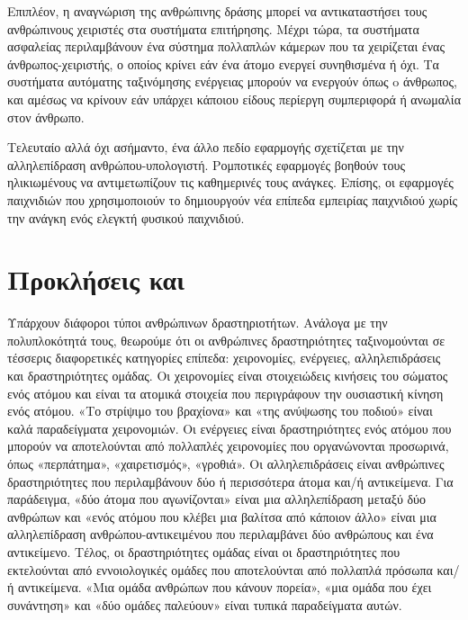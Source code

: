 Επιπλέον, η αναγνώριση της ανθρώπινης δράσης μπορεί να αντικαταστήσει τους ανθρώπινους χειριστές στα συστήματα επιτήρησης. Μέχρι τώρα,
τα συστήματα ασφαλείας περιλαμβάνουν ένα σύστημα πολλαπλών κάμερων που τα χειρίζεται ένας άνθρωπος-χειριστής, ο οποίος κρίνει εάν ένα άτομο
ενεργεί συνηθισμένα ή όχι. Τα συστήματα αυτόματης ταξινόμησης ενέργειας μπορούν να ενεργούν όπως o άνθρωπος, και αμέσως να κρίνουν
εάν υπάρχει κάποιου είδους περίεργη συμπεριφορά ή ανωμαλία στον άνθρωπο.

Τελευταίο αλλά όχι ασήμαντο, ένα άλλο πεδίο εφαρμογής σχετίζεται με την αλληλεπίδραση ανθρώπου-υπολογιστή. Ρομποτικές εφαρμογές
βοηθούν τους ηλικιωμένους να αντιμετωπίζουν τις καθημερινές τους ανάγκες. Επίσης, οι εφαρμογές παιχνιδιών που χρησιμοποιούν το  δημιουργούν νέα επίπεδα
εμπειρίας παιχνιδιού χωρίς την ανάγκη ενός ελεγκτή φυσικού παιχνιδιού.


\section{Προκλήσεις και }

Υπάρχουν διάφοροι τύποι ανθρώπινων δραστηριοτήτων. Ανάλογα με την πολυπλοκότητά τους, θεωρούμε ότι οι ανθρώπινες δραστηριότητες ταξινομούνται σε τέσσερις διαφορετικές κατηγορίες
επίπεδα: χειρονομίες, ενέργειες, αλληλεπιδράσεις και δραστηριότητες ομάδας. Οι χειρονομίες είναι στοιχειώδεις κινήσεις του σώματος ενός ατόμου και είναι τα ατομικά
στοιχεία που περιγράφουν την ουσιαστική κίνηση ενός ατόμου. «Το στρίψιμο του βραχίονα» και «της ανύψωσης του ποδιού» είναι καλά παραδείγματα χειρονομιών.
Οι ενέργειες είναι δραστηριότητες ενός ατόμου που μπορούν να αποτελούνται από πολλαπλές χειρονομίες που οργανώνονται προσωρινά, όπως «περπάτημα», «χαιρετισμός», «γροθιά».
Οι αλληλεπιδράσεις είναι ανθρώπινες δραστηριότητες που περιλαμβάνουν δύο ή περισσότερα άτομα και/ή αντικείμενα. Για παράδειγμα, «δύο άτομα που αγωνίζονται» είναι 
μια αλληλεπίδραση μεταξύ δύο ανθρώπων και  «ενός ατόμου που κλέβει μια βαλίτσα από κάποιον άλλο» είναι μια αλληλεπίδραση ανθρώπου-αντικειμένου που περιλαμβάνει δύο ανθρώπους και ένα
αντικείμενο. Τέλος, οι δραστηριότητες ομάδας είναι οι δραστηριότητες που εκτελούνται από εννοιολογικές ομάδες που αποτελούνται από πολλαπλά πρόσωπα και/ή αντικείμενα. «Μια ομάδα ανθρώπων
που κάνουν πορεία», «μια ομάδα που έχει συνάντηση» και «δύο ομάδες παλεύουν» είναι τυπικά παραδείγματα αυτών.

